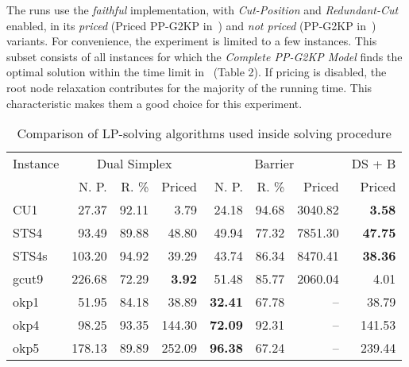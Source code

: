 \documentclass[ppgc,tese,english,formais,babel]{iiufrgs}
\begin{document}
The runs use the \emph{faithful} implementation, with \emph{Cut-Position} and \emph{Redundant-Cut} enabled, in its \emph{priced} (Priced PP-G2KP in~\citet{dimitri_thesis}) and \emph{not priced} (PP-G2KP in~\citet{dimitri_thesis}) variants.
For convenience, the experiment is limited to a few instances.
This subset consists of all instances for which the \emph{Complete PP-G2KP Model} finds the optimal solution within the time limit in~\citet{furini:2016} (Table 2).
If pricing is disabled, the root node relaxation contributes for the majority of the running time.
This characteristic makes them a good choice for this experiment.

\begin{table}
\centering
\caption{Comparison of LP-solving algorithms used inside solving procedure}
\begin{tabular}{@{\extracolsep{4pt}}lrrrrrrr@{}}
\hline\hline
Instance & \multicolumn{3}{c}{Dual Simplex} & \multicolumn{3}{c}{Barrier} & DS + B \\\cline{2-4}\cline{5-7}
& N. P. & R. \% & Priced & N. P. & R. \% & Priced & Priced \\\hline
CU1 & 27.37 & 92.11 & 3.79 & 24.18 & 94.68 & 3040.82 & \textbf{3.58} \\
STS4 & 93.49 & 89.88 & 48.80 & 49.94 & 77.32 & 7851.30 & \textbf{47.75} \\
STS4s & 103.20 & 94.92 & 39.29 & 43.74 & 86.34 & 8470.41 & \textbf{38.36} \\
gcut9 & 226.68 & 72.29 & \textbf{3.92} & 51.48 & 85.77 & 2060.04 & 4.01 \\
okp1 & 51.95 & 84.18 & 38.89 & \textbf{32.41} & 67.78 & -- & 38.79 \\
okp4 & 98.25 & 93.35 & 144.30 & \textbf{72.09} & 92.31 & -- & 141.53 \\
okp5 & 178.13 & 89.89 & 252.09 & \textbf{96.38} & 67.24 & -- & 239.44 \\\hline\hline
\end{tabular}
\label{tab:lp_method_comparison}
\end{table}
\end{document}
